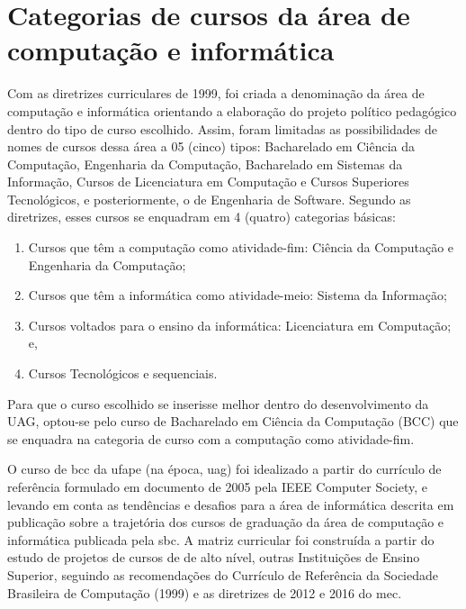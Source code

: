 \documentclass[
	12pt,				%
	openright,			%
  oneside,     %
	a4paper,			%
 hyphens,
	chapter=TITLE,		%
	english,			%
	french,				%
	spanish,			%
	brazil				%
	]{abntex2}
\begin{document}
\section{Categorias de cursos da área de computação e informática}

Com as diretrizes curriculares de 1999, foi criada a denominação da área de computação e informática orientando a elaboração do projeto político pedagógico dentro do tipo de curso escolhido. Assim, foram limitadas as possibilidades de nomes de cursos dessa área a 05 (cinco) tipos: Bacharelado em Ciência da Computação, Engenharia da Computação, Bacharelado em Sistemas da Informação, Cursos de Licenciatura em Computação e Cursos Superiores Tecnológicos, e posteriormente, o de Engenharia de Software. Segundo as diretrizes, esses cursos se enquadram em 4 (quatro) categorias básicas:

\begin{enumerate}
    \item Cursos que têm a computação como atividade-fim: Ciência da Computação e Engenharia da Computação;
    \item Cursos que têm a informática como atividade-meio: Sistema da Informação;
    \item Cursos voltados para o ensino da informática: Licenciatura em Computação; e,
    \item Cursos Tecnológicos e sequenciais.
\end{enumerate}

Para que o curso escolhido se inserisse melhor dentro do desenvolvimento da UAG, optou-se pelo curso de Bacharelado em Ciência da Computação (BCC) que se enquadra na categoria de curso com a computação como atividade-fim.

O curso de \acrshort{bcc} da \acrshort{ufape} (na época, \acrshort{uag}) foi idealizado a partir do currículo de referência formulado em documento de 2005 pela IEEE Computer Society, e levando em conta as tendências e desafios para a área de informática descrita em publicação sobre a trajetória dos cursos de graduação da área de computação e informática publicada pela \acrshort{sbc}. A matriz curricular foi construída a partir do estudo de projetos de cursos de de alto nível, outras Instituições de Ensino Superior, seguindo as recomendações do Currículo de Referência da Sociedade Brasileira de Computação (1999) e as diretrizes de 2012 e 2016 do \acrshort{mec}.
\end{document}
